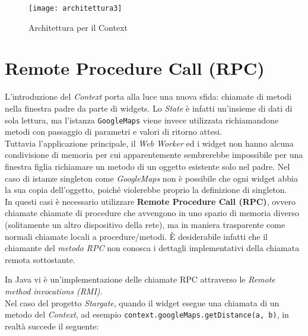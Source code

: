 \begin{figure}[H] 
  \centering 
  \texttt{[image: architettura3]} 
  \caption{Architettura per il Context}
\end{figure}

\section{Remote Procedure Call (RPC)}\label{rpc}

L'introduzione del \textit{Context} porta alla luce una nuova sfida: chiamate di metodi nella finestra padre da parte di widgets. Lo \textit{State} è infatti un'insieme di dati di sola lettura, ma l'istanza \texttt{GoogleMaps} viene invece utilizzata richiamandone metodi con passaggio di parametri e valori di ritorno attesi. \\

Tuttavia l'applicazione principale, il \textit{Web Worker} ed i widget non hanno alcuna condivisione di memoria per cui apparentemente sembrerebbe impossibile per una finestra figlia richiamare un metodo di un oggetto esistente solo nel padre. Nel caso di istanze singleton come \textit{GoogleMaps} non è possibile che ogni widget abbia la sua copia dell'oggetto, poiché violerebbe proprio la definizione di singleton. \\

In questi casi è necessario utilizzare \textbf{Remote Procedure Call (RPC)}, ovvero chiamate chiamate di procedure che avvengono in uno spazio di memoria diverso (solitamente un altro dispositivo della rete), ma in maniera trasparente come normali chiamate locali a procedure/metodi. È desiderabile infatti che il chiamante del \textit{metodo RPC} non conosca i dettagli implementativi della chiamata remota sottostante.

In Java vi è un'implementazione delle chiamate RPC attraverso le \textit{Remote method invocations (RMI)}. \\

Nel caso del progetto \textit{Stargate}, quando il widget esegue una chiamata di un metodo del \textit{Context}, ad esempio \texttt{context.googleMaps.getDistance(a, b)}, in realtà succede il seguente:

